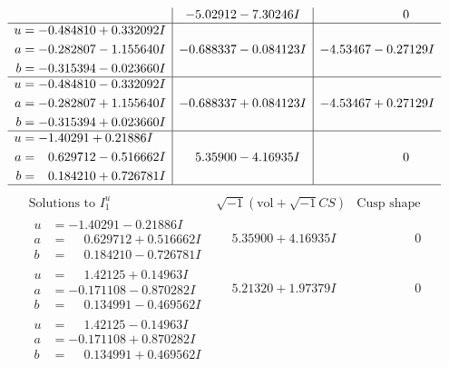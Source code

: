 \documentclass[1p]{elsarticle_modified}
\theoremstyle{definition}
\newcommand{\I}{\sqrt{-1}}
\begin{document}
$$\begin{array}{c|c|c}
 & -5.02912 - 7.30246 I & \phantom{-0.000000 } 0 \\ \hline\begin{aligned}
u &= -0.484810 + 0.332092 I \\
a &= -0.282807 - 1.155640 I \\
b &= -0.315394 - 0.023660 I\end{aligned}
 & -0.688337 - 0.084123 I & -4.53467 - 0.27129 I \\ \hline\begin{aligned}
u &= -0.484810 - 0.332092 I \\
a &= -0.282807 + 1.155640 I \\
b &= -0.315394 + 0.023660 I\end{aligned}
 & -0.688337 + 0.084123 I & -4.53467 + 0.27129 I \\ \hline\begin{aligned}
u &= -1.40291 + 0.21886 I \\
a &= \phantom{-}0.629712 - 0.516662 I \\
b &= \phantom{-}0.184210 + 0.726781 I\end{aligned}
 & \phantom{-}5.35900 - 4.16935 I & \phantom{-0.000000 } 0\\
 \hline 
 \end{array}$$\newpage$$\begin{array}{c|c|c}  
\text{Solutions to }I^u_{1}& \I (\text{vol} + \sqrt{-1}CS) & \text{Cusp shape}\\
 \hline 
\begin{aligned}
u &= -1.40291 - 0.21886 I \\
a &= \phantom{-}0.629712 + 0.516662 I \\
b &= \phantom{-}0.184210 - 0.726781 I\end{aligned}
 & \phantom{-}5.35900 + 4.16935 I & \phantom{-0.000000 } 0 \\ \hline\begin{aligned}
u &= \phantom{-}1.42125 + 0.14963 I \\
a &= -0.171108 - 0.870282 I \\
b &= \phantom{-}0.134991 - 0.469562 I\end{aligned}
 & \phantom{-}5.21320 + 1.97379 I & \phantom{-0.000000 } 0 \\ \hline\begin{aligned}
u &= \phantom{-}1.42125 - 0.14963 I \\
a &= -0.171108 + 0.870282 I \\
b &= \phantom{-}0.134991 + 0.469562 I\end{aligned}

\end{array}$$
\end{document}
